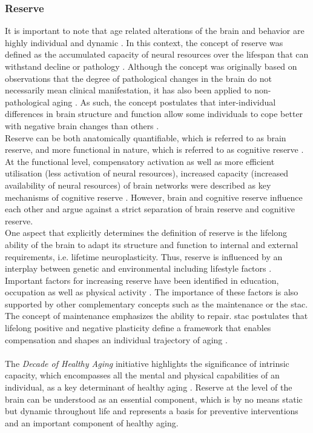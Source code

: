 \subsubsection{Reserve}
\label{theory:aging:reserve}
It is important to note that age related alterations of the brain and behavior are highly individual and dynamic \cite{Smith2020,Koen2019,Douw2014}. In this context, the concept of reserve was defined as the accumulated capacity of neural resources over the lifespan that can withstand decline or pathology \cite{Cabeza2018, Stern2009}. Although the concept was originally based on observations that the degree of pathological changes in the brain do not necessarily mean clinical manifestation, it has also been applied to non-pathological aging \cite{Esiri2001,Cabeza2018,Stern2009}. As such, the concept postulates that inter-individual differences in brain structure and function allow some individuals to cope better with negative brain changes than others \cite{Stern2009}.\\
Reserve can be both anatomically quantifiable, which is referred to as brain reserve, and more functional in nature, which is referred to as cognitive reserve \cite{Stern2009}. At the functional level, compensatory activation as well as more efficient utilisation (less activation of neural resources), increased capacity (increased availability of neural resources) of brain networks were described as key mechanisms of cognitive reserve \cite{Stern2004,Stern2009}. However, brain and cognitive reserve influence each other and \citeauthor{Cabeza2018} \cite{Cabeza2018} argue against a strict separation of brain reserve and cognitive reserve.\\
One aspect that explicitly determines the definition of reserve is the lifelong ability of the brain to adapt its structure and function to internal and external requirements, i.e. lifetime neuroplasticity. Thus, reserve is influenced by an interplay between genetic and environmental including lifestyle factors \cite{Cabeza2018}. Important factors for increasing reserve have been identified in education, occupation as well as physical activity \cite{Cabeza2018,Stern2009}. The importance of these factors is also supported by other complementary concepts such as the maintenance or the \gls{stac}. The concept of maintenance emphasizes the ability to repair. \Gls{stac} postulates that lifelong positive and negative plasticity define a framework that enables compensation and shapes an individual trajectory of aging \cite{Reuter-Lorenz2014}.\\
\\
The \textit{Decade of Healthy Aging} initiative highlights the significance of intrinsic capacity, which encompasses all the mental and physical capabilities of an individual, as a key determinant of healthy aging \cite{who_decade_ha2020}. Reserve at the level of the brain can be understood as an essential component, which is by no means static but dynamic throughout life and represents a basis for preventive interventions and an important component of healthy aging. 

